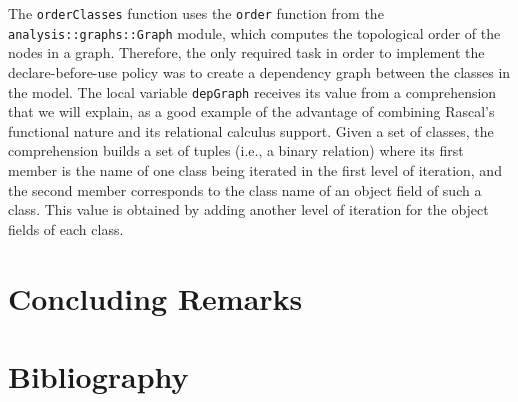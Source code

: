 \documentclass[submission,copyright,creativecommons]{eptcs}
\begin{document}
The \texttt{orderClasses} function uses the \texttt{order} function from the \texttt{analysis::graphs::Graph} module, which computes the topological order of the nodes in a graph. Therefore, the only required task in order to implement the declare-before-use policy was to create a dependency graph between the classes in the model.  The local variable \texttt{depGraph} receives its value from a comprehension that we will explain, as a good example of the advantage of combining Rascal's functional nature and its relational calculus support. Given a set of classes, the comprehension builds a set of tuples (i.e., a binary relation) where its first member is the name of one class being iterated in the first level of iteration, and the second member corresponds to the class name of an object field of such a class. This value is obtained by adding another level of iteration for the object fields of each class.

\section{Concluding Remarks}


\section{Bibliography}

\nocite{*}


\end{document}
